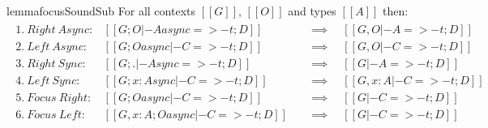 \begin{restatable}{lemma}{focusSoundSub}
For all contexts $[[ G ]]$, $[[ O ]]$ and types $[[ A ]]$
then:
\begin{align*}
\begin{array}{lll}
 1.\ Right\ Async: & [[ G ; O |- A async =>- t ; D ]] \quad &\implies \quad [[ G , O |- A =>- t ; D ]]\\
 2.\ Left\ Async: & [[ G ; O async |- C =>- t ; D ]] \quad &\implies \quad [[ G , O |- C =>- t ; D ]]\\
 3.\ Right\ Sync: & [[ G ; . |- A sync =>- t ; D ]] \quad &\implies \quad [[ G |- A =>- t ; D ]]\\
 4.\ Left\ Sync: & [[ G ; {x : A }sync |- C =>- t ; D ]] \quad &\implies \quad [[ G, x : A |- C =>- t ; D ]]\\
 5.\ Focus\ Right: & [[ G ; O async |- C =>- t ; D ]] \quad &\implies \quad [[ G |- C =>- t ; D ]]\\
 6.\ Focus\ Left: & [[ G, x : A ; O async |- C =>- t ; D ]] \quad &\implies \quad [[ G |- C =>- t ; D ]]
\end{array}
\end{align*}
\end{restatable}
